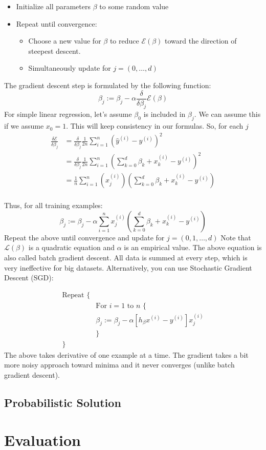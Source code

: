 \documentclass{article}
\begin{document}
\begin{itemize}
	\item Initialize all parameters \(\beta\) to some random value
	\item Repeat until convergence:
\begin{itemize}
	\item Choose a new value for \(\beta\) to reduce \(\mathcal{E}(\beta)\) toward the direction of steepest descent.
	\item Simultaneously update for \(j = (0, \dots, d)\)
\end{itemize}
\end{itemize}
The gradient descent step is formulated by the following function:
\[
	\beta_j := \beta_j - \alpha \frac{\delta}{\delta\beta_j}\mathcal{E}(\beta)
\]
For simple linear regression, let's assume \(\beta_0\) is included in \(\beta_j\). We can assume this if we assume \(x_0 = 1\). This will keep consistency in our formulas. So, for each \(j\) 
\begin{align*}
	\frac{\delta\mathcal{E}}{\delta\beta_j} &= \frac{\delta}{\delta\beta_j}\frac{1}{2n}\sum_{i=1}^n \left(\hat y^{(i)} - y^{(i)}\right)^2 \\
										  &= \frac{\delta}{\delta\beta_j}\frac{1}{2n}\sum_{i=1}^n \left(\sum_{k=0}^d\beta_k + x_k^{(i)} - y^{(i)}\right)^2 \\
										  &= \frac{1}{n}\sum_{i=1}^n (x_j^{(i)})\left(\sum_{k=0}^d\beta_k + x_k^{(i)} - y^{(i)}\right) \\
\end{align*}

Thus, for all training examples:
\[
	\beta_j := \beta_j - \alpha \sum_{i=1}^n x_j^{(i)}\left(\sum_{k=0}^d\beta_k + x_k^{(i)} - y^{(i)}\right)
\]
Repeat the above until convergence and update for \(j = (0,1,\dots,d)\)
Note that \(\mathcal{L}(\beta)\) is a quadratic equation and \(\alpha\) is an empirical value. The above equation is also called batch gradient descent. All data is summed at every step, which is very ineffective for big datasets. Alternatively, you can use Stochastic Gradient Descent (SGD): 

\begin{align*}
	\text{Repeat \{} \\
	&\text{For }i=1 \text{ to } n \text{ \{} \\
	&\beta_j := \beta_j - \alpha\left[h_\beta x^{(i)} - y^{(i)}\right]x_j^{(i)}\\
	&\text{\}} \\
	\text{\}}
\end{align*}
The above takes derivative of one example at a time. The gradient takes a bit more noisy approach toward minima and it never converges (unlike batch gradient descent).



\subsection{Probabilistic Solution}

\section{Evaluation}
\end{document}
